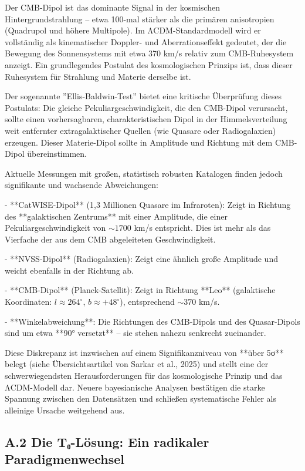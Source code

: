 	Der CMB-Dipol ist das dominante Signal in der kosmischen Hintergrundstrahlung – etwa 100-mal stärker als die primären anisotropien (Quadrupol und höhere Multipole). Im ΛCDM-Standardmodell wird er vollständig als kinematischer Doppler- und Aberrationseffekt gedeutet, der die Bewegung des Sonnensystems mit etwa 370 km/s relativ zum CMB-Ruhesystem anzeigt. Ein grundlegendes Postulat des kosmologischen Prinzips ist, dass dieser Ruhesystem für Strahlung und Materie derselbe ist. 
	
	Der sogenannte ''Ellis-Baldwin-Test'' bietet eine kritische Überprüfung dieses Postulats: Die gleiche Pekuliargeschwindigkeit, die den CMB-Dipol verursacht, sollte einen vorhersagbaren, charakteristischen Dipol in der Himmelsverteilung weit entfernter extragalaktischer Quellen (wie Quasare oder Radiogalaxien) erzeugen. Dieser Materie-Dipol sollte in Amplitude und Richtung mit dem CMB-Dipol übereinstimmen.
	
	Aktuelle Messungen mit großen, statistisch robusten Katalogen finden jedoch signifikante und wachsende Abweichungen:
	
	- **CatWISE-Dipol** (1,3 Millionen Quasare im Infraroten): Zeigt in Richtung des **galaktischen Zentrums** mit einer Amplitude, die einer Pekuliargeschwindigkeit von $\sim 1700$ km/s entspricht. Dies ist mehr als das Vierfache der aus dem CMB abgeleiteten Geschwindigkeit.
	
	- **NVSS-Dipol** (Radiogalaxien): Zeigt eine ähnlich große Amplitude und weicht ebenfalls in der Richtung ab.
	
	- **CMB-Dipol** (Planck-Satellit): Zeigt in Richtung **Leo** (galaktische Koordinaten: $l \approx 264^\circ$, $b \approx +48^\circ$), entsprechend $\sim 370$ km/s.
	
	- **Winkelabweichung**: Die Richtungen des CMB-Dipols und des Quasar-Dipols sind um etwa **90° versetzt** – sie stehen nahezu senkrecht zueinander.
	
	Diese Diskrepanz ist inzwischen auf einem Signifikanzniveau von **über 5σ** belegt (siehe Übersichtsartikel von Sarkar et al., 2025) und stellt eine der schwerwiegendsten Herausforderungen für das kosmologische Prinzip und das ΛCDM-Modell dar. Neuere bayesianische Analysen bestätigen die starke Spannung zwischen den Datensätzen und schließen systematische Fehler als alleinige Ursache weitgehend aus.
	
	\subsection*{A.2 Die T₀-Lösung: Ein radikaler Paradigmenwechsel}
	
